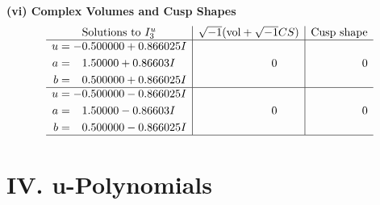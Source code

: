 \documentclass[1p]{elsarticle_modified}
\theoremstyle{definition}
\newcommand{\I}{\sqrt{-1}}
\begin{document}
\newpage\flushleft \textbf{(vi) Complex Volumes and Cusp Shapes}
$$\begin{array}{c|c|c}  
\text{Solutions to }I^u_{3}& \I (\text{vol} + \sqrt{-1}CS) & \text{Cusp shape}\\
 \hline 
\begin{aligned}
u &= -0.500000 + 0.866025 I \\
a &= \phantom{-}1.50000 + 0.86603 I \\
b &= \phantom{-}0.500000 + 0.866025 I\end{aligned}
 & \phantom{-0.000000 } 0 & \phantom{-0.000000 } 0 \\ \hline\begin{aligned}
u &= -0.500000 - 0.866025 I \\
a &= \phantom{-}1.50000 - 0.86603 I \\
b &= \phantom{-}0.500000 - 0.866025 I\end{aligned}
 & \phantom{-0.000000 } 0 & \phantom{-0.000000 } 0\\
 \hline 
 \end{array}$$\newpage
\newpage\renewcommand{\arraystretch}{1}
\centering \section*{ IV. u-Polynomials}
\end{document}
